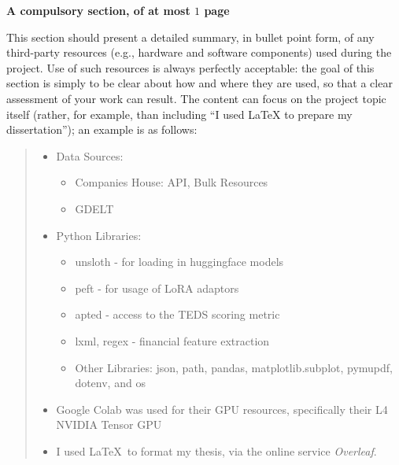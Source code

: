 \documentclass[ %
                    author={Natchalin Iwsakul \\[0.4em] Inkaphol Siriwongwattana \\[0.4em] Tanaphan Kummaraphat \\[0.6em] Patorn Srisupap},,
                supervisor={Fernando Moreno-Pino},
                    degree={MSc},
                     title={Propensity Modelling for SME Commercial Lending Using Open Public Data
},
                  subtitle={Companies House and GDELT as predictors of first-time borrowing},
                      type={},
                      year={2026}]{dissertation}
\begin{document}
{\bf A compulsory section, of at most $1$ page}
\vspace{1cm} 

\noindent
This section should present a detailed summary, in bullet point form, 
of any third-party resources (e.g., hardware and software components) 
used during the project.  Use of such resources is always perfectly 
acceptable: the goal of this section is simply to be clear about how
and where they are used, so that a clear assessment of your work can
result.  The content can focus on the project topic itself (rather,
for example, than including ``I used \mbox{\LaTeX} to prepare my 
dissertation''); an example is as follows:

\begin{quote}
\noindent
\begin{itemize}
\item Data Sources:
\begin{itemize}
    \item Companies House: API, Bulk Resources
    \item GDELT
\end{itemize}
\item Python Libraries:
\begin{itemize}
    \item unsloth - for loading in huggingface models
    \item peft - for usage of LoRA adaptors
    \item apted - access to the TEDS scoring metric
    \item lxml, regex - financial feature extraction
    \item Other Libraries: json, path, pandas, matplotlib.subplot, pymupdf, dotenv, and os
    
\end{itemize}
\item Google Colab was used for their GPU resources, specifically their L4 NVIDIA Tensor GPU
\item I used \LaTeX\ to format my thesis, via the online service {\em Overleaf}. 
\end{itemize}
\end{quote}


%
\end{document}
